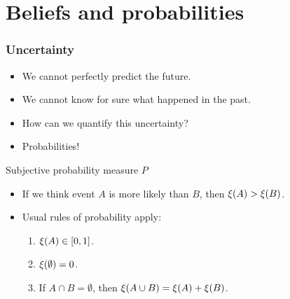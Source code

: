 \section{Beliefs and probabilities}

\begin{frame}
  \frametitle{Uncertainty}
  \begin{itemize}
  \item<1-> We cannot perfectly predict the future.
  \item<2-> We cannot know for sure what happened in the past.
  \item<3-> How can we quantify this uncertainty?
  \item<4-> Probabilities!
  \end{itemize}
  \begin{block}{Subjective probability measure $P$}
    \begin{itemize}
    \item If we think event $A$ is more likely than $B$, then $\xi(A) > \xi(B)$.
    \item Usual rules of probability apply:
      \begin{enumerate}
      \item<6-> $\xi(A) \in [0,1]$.
      \item<7-> $\xi(\emptyset) = 0$.
      \item<8-> If $A \cap B = \emptyset$, then $\xi(A \cup B) = \xi(A) + \xi(B)$.
      \end{enumerate}
    \end{itemize}
  \end{block}
\end{frame}

